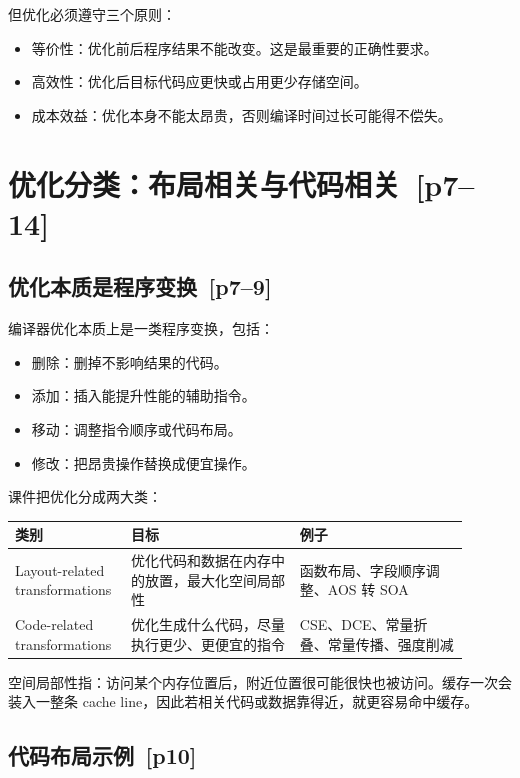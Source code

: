 \documentclass[UTF8,fontset=none,11pt]{ctexart}
\newenvironment{defbox}[1][]{%
  \par\medskip\noindent{\color{defrule}\rule{\linewidth}{1.1pt}}\par\nopagebreak
  \noindent{\bfseries\color{defrule}#1}\par\nopagebreak\smallskip}%
  {\par\nopagebreak\smallskip\noindent{\color{defrule}\rule{\linewidth}{0.4pt}}\par\medskip}
\newcommand{\pg}[1]{\texorpdfstring{{\small\color{graytext}\,[p#1]}}{ [p#1]}}
\begin{document}
但优化必须遵守三个原则：

\begin{itemize}
  \item 等价性：优化前后程序结果不能改变。这是最重要的正确性要求。
  \item 高效性：优化后目标代码应更快或占用更少存储空间。
  \item 成本效益：优化本身不能太昂贵，否则编译时间过长可能得不偿失。
\end{itemize}

\section{优化分类：布局相关与代码相关 \pg{7--14}}

\subsection{优化本质是程序变换 \pg{7--9}}

编译器优化本质上是一类程序变换，包括：

\begin{itemize}
  \item 删除：删掉不影响结果的代码。
  \item 添加：插入能提升性能的辅助指令。
  \item 移动：调整指令顺序或代码布局。
  \item 修改：把昂贵操作替换成便宜操作。
\end{itemize}

课件把优化分成两大类：

\begin{longtable}{L{0.20\linewidth}L{0.35\linewidth}L{0.35\linewidth}}
\toprule
类别 & 目标 & 例子 \\
\midrule
Layout-related transformations & 优化代码和数据在内存中的放置，最大化空间局部性 & 函数布局、字段顺序调整、AOS 转 SOA \\
Code-related transformations & 优化生成什么代码，尽量执行更少、更便宜的指令 & CSE、DCE、常量折叠、常量传播、强度削减 \\
\bottomrule
\end{longtable}

\begin{defbox}[空间局部性]
空间局部性指：访问某个内存位置后，附近位置很可能很快也被访问。缓存一次会装入一整条 cache line，因此若相关代码或数据靠得近，就更容易命中缓存。
\end{defbox}

\subsection{代码布局示例 \pg{10}}
\end{document}
